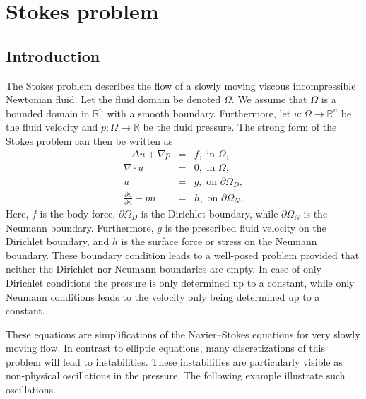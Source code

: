\chapter{Stokes problem}
\label{chap-stokes}



\section{Introduction}
The Stokes problem describes the flow of a slowly moving viscous incompressible Newtonian
fluid.  Let the fluid domain be denoted $\Omega$. We assume that $\Omega$ is a bounded domain in $\mathbb{R}^n$ with a smooth boundary. Furthermore, let $u : \Omega \rightarrow \mathbb{R}^n$ be
the fluid velocity and $p:\Omega \rightarrow \mathbb{R}$ be the fluid pressure.
The strong form of the Stokes problem can then be written as
\begin{eqnarray}
-\Delta u + \nabla p &=& f, \mbox{ in } \Omega,   \\
\nabla \cdot u &=& 0, \mbox{ in } \Omega, \\
u &=& g, \mbox{ on } \partial \Omega_D, \\
\frac{\partial u}{\partial n} - p n  &=& h, \mbox{ on } \partial \Omega_N.
\end{eqnarray}
Here, $f$ is the body force, $\partial \Omega_D$ is the Dirichlet
boundary, while $\partial \Omega_N$ is the Neumann
boundary. Furthermore, $g$ is the prescribed fluid velocity on the
Dirichlet boundary, and $h$ is the surface force or stress on the
Neumann boundary. These boundary condition leads to a well-posed
problem provided that neither the Dirichlet nor Neumann boundaries are
empty.  In case of only Dirichlet conditions the pressure is only
determined up to a constant, while only Neumann conditions leads to
the velocity only being determined up to a constant.

These equations are simplifications of the Navier--Stokes equations for
very slowly moving flow.  In contrast to elliptic equations, many
discretizations of this problem will lead to instabilities.  These
instabilities are particularly visible as non-physical oscillations in
the pressure. The following example illustrate such oscillations.

